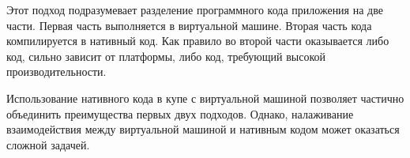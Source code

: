 Этот подход подразумевает разделение программного кода приложения на две части. 
Первая часть выполняется в виртуальной машине.
Вторая часть кода компилируется в нативный код. Как правило во второй части оказывается либо код, сильно зависит от платформы, либо код, требующий высокой производительности.

Использование нативного кода в купе с виртуальной машиной позволяет частично объединить преимущества первых двух подходов. Однако, налаживание взаимодействия между виртуальной машиной и нативным кодом может оказаться сложной задачей.
